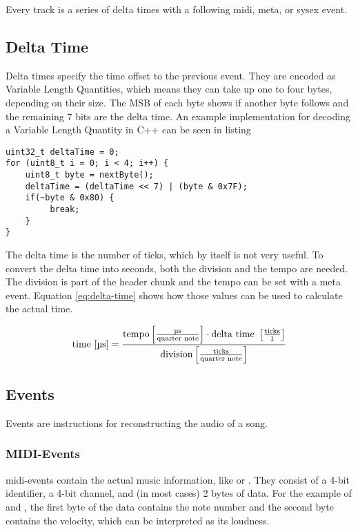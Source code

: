 Every track is a series of delta times with a following \gls{midi}, meta, or sysex event.

\subsection{Delta Time}

Delta times specify the time offset to the previous event. They are encoded as Variable Length Quantities, which means they can take up one to four bytes, depending on their size. The MSB %
of each byte shows if another byte follows and the remaining 7 bits are the delta time. An example implementation for decoding a Variable Length Quantity in C++ can be seen in listing

\begin{lstlisting}
uint32_t deltaTime = 0;
for (uint8_t i = 0; i < 4; i++) {
    uint8_t byte = nextByte();
    deltaTime = (deltaTime << 7) | (byte & 0x7F);
    if(~byte & 0x80) {
         break;
    }
}
\end{lstlisting}

The delta time is the number of ticks, which by itself is not very useful. To convert the delta time into seconds, both the division and the tempo are needed. The division is part of the header chunk and the tempo can be set with a meta event. Equation \ref{eq:delta-time} shows how those values can be used to calculate the actual time.

\begin{equation}\label{eq:delta-time}
    \textnormal{time [\textmu s]} = \frac{{\textnormal{tempo} \left[ \frac{\textnormal{\textmu s}}{\textnormal{quarter note}} \right] \cdot \textnormal{delta time } \left[\frac{\textnormal{ticks}}{1}\right]}}{\textnormal{division}  \left[ \frac{\textnormal{ticks}}{\textnormal{quarter note}} \right]}
\end{equation}

\subsection{Events}

Events are instructions for reconstructing the audio of a song.

\subsubsection{MIDI-Events}

\gls{midi}-events contain the actual music information, like  or . They consist of a 4-bit identifier, a 4-bit channel, and (in most cases) 2 bytes of data. For the example of  and , the first byte of the data contains the note number and the second byte contains the velocity, which can be interpreted as its loudness.

